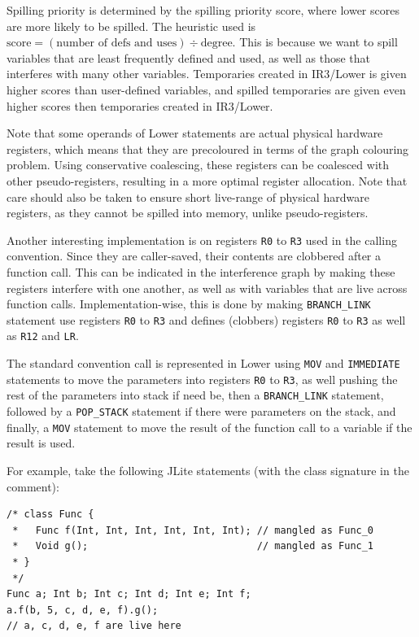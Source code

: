 \documentclass[nonacm, acmsmall, screen, 10pt]{acmart}
\begin{document}
Spilling priority is determined by the spilling priority score, where lower scores are more likely to be spilled.
The heuristic used is $\text{score} = (\text{number of defs and uses}) \div \text{degree}$.
This is because we want to spill variables that are least frequently defined and used, as well as those that interferes with many other variables.
Temporaries created in IR3/Lower is given higher scores than user-defined variables, and spilled temporaries are given even higher scores then temporaries created in IR3/Lower.

Note that some operands of Lower statements are actual physical hardware registers, which means that they are precoloured in terms of the graph colouring problem.
Using conservative coalescing, these registers can be coalesced with other pseudo-registers, resulting in a more optimal register allocation.
Note that care should also be taken to ensure short live-range of physical hardware registers, as they cannot be spilled into memory, unlike pseudo-registers.

Another interesting implementation is on registers \texttt{R0} to \texttt{R3} used in the calling convention.
Since they are caller-saved, their contents are clobbered after a function call.
This can be indicated in the interference graph by making these registers interfere with one another, as well as with variables that are live across function calls.
Implementation-wise, this is done by making \texttt{BRANCH\_LINK} statement use registers \texttt{R0} to \texttt{R3} and defines (clobbers) registers \texttt{R0} to \texttt{R3} as well as \texttt{R12} and \texttt{LR}.

The standard convention call is represented in Lower using \texttt{MOV} and \texttt{IMMEDIATE} statements to move the parameters into registers \texttt{R0} to \texttt{R3}, as well pushing the rest of the parameters into stack if need be, then a \texttt{BRANCH\_LINK} statement, followed by a \texttt{POP\_STACK} statement if there were parameters on the stack, and finally, a \texttt{MOV} statement to move the result of the function call to a variable if the result is used.

For example, take the following JLite statements (with the class signature in the comment):
\begin{verbatim}
/* class Func {
 *   Func f(Int, Int, Int, Int, Int, Int); // mangled as Func_0
 *   Void g();                             // mangled as Func_1
 * }
 */
Func a; Int b; Int c; Int d; Int e; Int f;
a.f(b, 5, c, d, e, f).g();
// a, c, d, e, f are live here
\end{verbatim}
\end{document}
